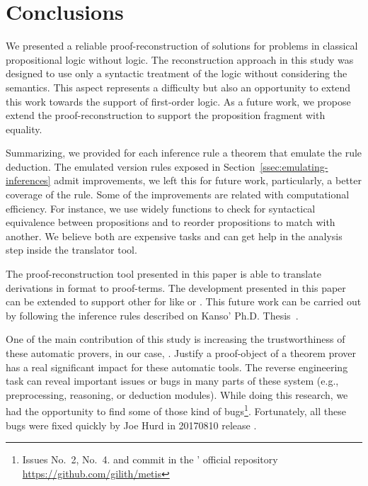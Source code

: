 \documentclass[../main.tex]{subfiles}
\begin{document}

\section{Conclusions}
\label{sec:conclusions}

We presented a reliable proof-reconstruction of \Metis solutions
for problems in classical propositional logic without logic.
The reconstruction approach in this study was designed to use
only a syntactic treatment of the logic without considering the
semantics. This aspect represents a difficulty but also an opportunity
to extend this work towards the support of first-order logic.
As a future work, we propose extend the proof-reconstruction to
support the  proposition fragment with equality.

Summarizing, we provided for each \Metis inference rule a theorem that
emulate the rule deduction. The emulated
version rules exposed in Section~\ref{ssec:emulating-inferences} admit
improvements, we left this for future work, particularly, a better
coverage of the \simplify rule.
Some of the improvements are related with computational efficiency.
For instance, we use widely functions to check for syntactical equivalence
between propositions and to reorder propositions to match with another.
We believe both are expensive tasks and can get help in the analysis
step inside the translator tool.

The proof-reconstruction tool presented in this paper
is able to translate \Metis derivations in \TSTP format to \Agda proof-terms.
The development presented in this paper can be extended to support
other \ATPs for \CPL like  or .
This future work can be carried out by following the  inference
rules described on Kanso' Ph.D. Thesis~\cite{Kanso2012}.

One of the main contribution of this study is
increasing the trustworthiness of these automatic provers,
in our case, \Metis. Justify a proof-object of a theorem prover has a real
significant impact for these automatic tools.
The reverse engineering task can reveal important issues or bugs
in many parts of these system (e.g., preprocessing, reasoning, or
deduction modules). While doing this research, we had the opportunity
to find some of those kind of bugs\footnote{Issues No.~2, No.~4. and
commit  in the \Metis' official repository
\url{https://github.com/gilith/metis}}. Fortunately, all these bugs
were fixed quickly by Joe Hurd in 20170810 release .
\end{document}
